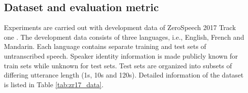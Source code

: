 \documentclass[a4paper]{article}
\begin{document}
\subsection{Dataset and evaluation metric}
Experiments are carried out with development data of ZeroSpeech 2017 Track one \cite{dunbar2017zero}.
The development data consists of three languages, i.e., English, French and Mandarin. Each language contains separate training and test sets of untranscribed speech. Speaker identity information is made publicly known for train sets while unknown for test sets. Test sets are organized into subsets of differing utterance length (1s, 10s and 120s). Detailed information of the dataset is listed in Table \ref{tab:zr17_data}.

\begin{table}[htbp]
\renewcommand\arraystretch{0.8}
\centering
\caption{Development data in ZeroSpeech 2017 Track one}
\label{tab:zr17_data}
\end{table}
\end{document}
